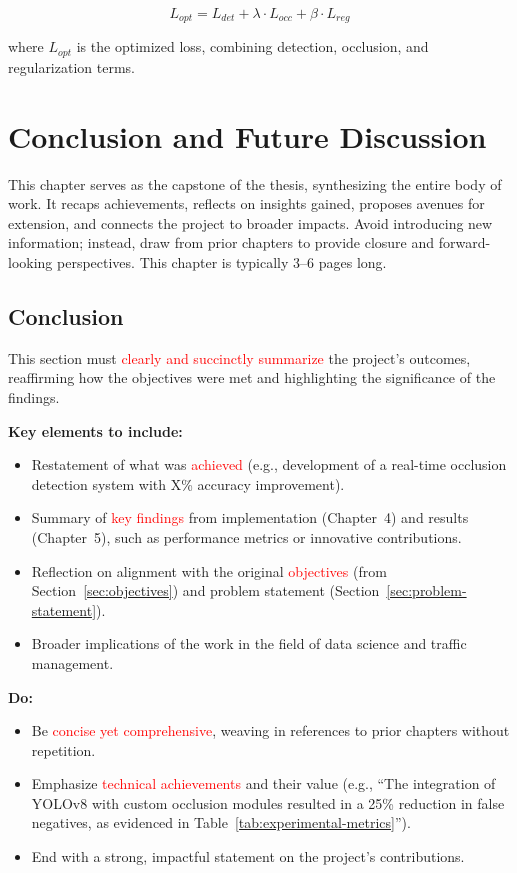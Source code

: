 \documentclass[12pt,a4paper]{report}
\theoremstyle{definition}
\theoremstyle{remark}
\begin{document}
\begin{equation}
    L_{opt} = L_{det} + \lambda \cdot L_{occ} + \beta \cdot L_{reg}
    \label{eq:optimized-loss}
\end{equation}

where $L_{opt}$ is the optimized loss, combining detection, occlusion, and regularization terms.




\chapter{Conclusion and Future Discussion}

This chapter serves as the capstone of the thesis, synthesizing the entire body of work. It recaps achievements, reflects on insights gained, proposes avenues for extension, and connects the project to broader impacts. Avoid introducing new information; instead, draw from prior chapters to provide closure and forward-looking perspectives. This chapter is typically 3--6 pages long.

\section{Conclusion}
\label{sec:conclusion}

This section must \textcolor{red}{clearly and succinctly summarize} the project's outcomes, reaffirming how the objectives were met and highlighting the significance of the findings.

\noindent \textbf{Key elements to include:}
\begin{itemize}
    \item Restatement of what was \textcolor{red}{achieved} (e.g., development of a real-time occlusion detection system with X\% accuracy improvement).
    \item Summary of \textcolor{red}{key findings} from implementation (Chapter~4) and results (Chapter~5), such as performance metrics or innovative contributions.
    \item Reflection on alignment with the original \textcolor{red}{objectives} (from Section~\ref{sec:objectives}) and problem statement (Section~\ref{sec:problem-statement}).
    \item Broader implications of the work in the field of data science and traffic management.
\end{itemize}

\noindent \textbf{Do:}
\begin{itemize}
    \item Be \textcolor{red}{concise yet comprehensive}, weaving in references to prior chapters without repetition.
    \item Emphasize \textcolor{red}{technical achievements} and their value (e.g., ``The integration of YOLOv8 with custom occlusion modules resulted in a 25\% reduction in false negatives, as evidenced in Table~\ref{tab:experimental-metrics}'').
    \item End with a strong, impactful statement on the project's contributions.
\end{itemize}
\end{document}
